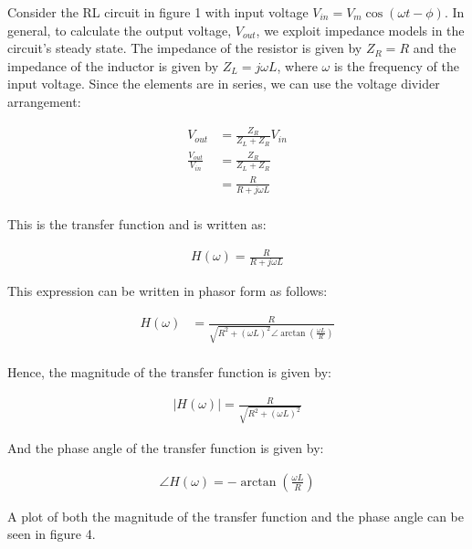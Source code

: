 \documentclass{article}
\begin{document}
\begin{description}
Consider the RL circuit in figure 1 with input voltage $V_{in} = V_m \cos(\omega t - \phi)$. In general, to calculate the output voltage, $V_{out}$, we exploit impedance models in the circuit's steady state. The impedance of the resistor is given by $Z_R = R$ and the impedance of the inductor is given by $Z_L = j \omega L$, where $\omega$ is the frequency of the input voltage. Since the elements are in series, we can use the voltage divider arrangement:

\begin{align*}
V_{out} &= \frac{Z_R}{Z_L + Z_R} V_{in} \\
\frac{V_{out}}{V_{in}} &= \frac{Z_R}{Z_L + Z_R} \\
& = \frac{R}{R + j \omega L} \\
\end{align*}

This is the transfer function and is written as:

\begin{align}
H(\omega) = \frac{R}{R + j \omega L}
\end{align}

This expression can be written in phasor form as follows:

\begin{align*}
H(\omega) &= \frac{R}{\sqrt{R^2 + (\omega L)^2} \angle \arctan(\frac{\omega L}{R})} \\
\end{align*}

Hence, the magnitude of the transfer function is given by:

\begin{align}
|H(\omega)| = \frac{R}{\sqrt{R^2 + (\omega L)^2}}
\end{align}

And the phase angle of the transfer function is given by:

\begin{align}
\angle H(\omega) = - \arctan (\frac{\omega L}{R})
\end{align}

A plot of both the magnitude of the transfer function and the phase angle can be seen in figure 4.


\end{description}
\end{document}

